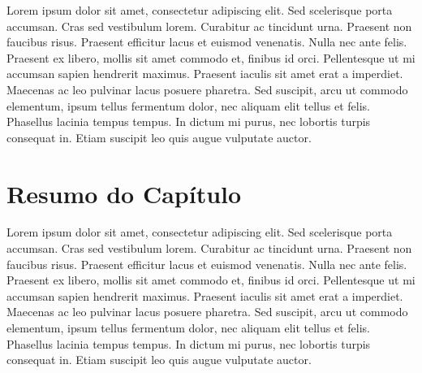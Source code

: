 Lorem ipsum dolor sit amet, consectetur adipiscing elit. Sed scelerisque porta accumsan. Cras sed vestibulum lorem. Curabitur ac tincidunt urna. Praesent non faucibus risus. Praesent efficitur lacus et euismod venenatis. Nulla nec ante felis. Praesent ex libero, mollis sit amet commodo et, finibus id orci. Pellentesque ut mi accumsan sapien hendrerit maximus. Praesent iaculis sit amet erat a imperdiet. Maecenas ac leo pulvinar lacus posuere pharetra. Sed suscipit, arcu ut commodo elementum, ipsum tellus fermentum dolor, nec aliquam elit tellus et felis. Phasellus lacinia tempus tempus. In dictum mi purus, nec lobortis turpis consequat in. Etiam suscipit leo quis augue vulputate auctor.

\section{Resumo do Capítulo}
\label{status-resumo}

Lorem ipsum dolor sit amet, consectetur adipiscing elit. Sed scelerisque porta accumsan. Cras sed vestibulum lorem. Curabitur ac tincidunt urna. Praesent non faucibus risus. Praesent efficitur lacus et euismod venenatis. Nulla nec ante felis. Praesent ex libero, mollis sit amet commodo et, finibus id orci. Pellentesque ut mi accumsan sapien hendrerit maximus. Praesent iaculis sit amet erat a imperdiet. Maecenas ac leo pulvinar lacus posuere pharetra. Sed suscipit, arcu ut commodo elementum, ipsum tellus fermentum dolor, nec aliquam elit tellus et felis. Phasellus lacinia tempus tempus. In dictum mi purus, nec lobortis turpis consequat in. Etiam suscipit leo quis augue vulputate auctor.